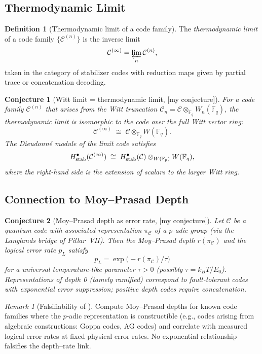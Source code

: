 \documentclass[12pt]{article}
\theoremstyle{definition}
\newtheorem{definition}{Definition}[section]
\theoremstyle{plain}
\newtheorem{conjecture}{Conjecture}[section]
\theoremstyle{remark}
\newtheorem{remark}{Remark}[section]
\newcommand{\myconj}{{\color{orange}[\textsf{my conjecture}]}}
\newcommand{\Fp}{\mathbb{F}_p}
\newcommand{\Fq}{\mathbb{F}_q}
\newcommand{\cC}{\mathcal{C}}
\begin{document}
\subsection{Thermodynamic Limit}

\begin{definition}[Thermodynamic limit of a code family]
The \emph{thermodynamic limit} of a code family $\{\cC^{(n)}\}$ is the inverse limit
\[
\cC^{(\infty)}=\varprojlim_{n}\cC^{(n)},
\]
taken in the category of stabilizer codes with reduction maps given by partial trace or concatenation decoding.
\end{definition}

\begin{conjecture}[Witt limit = thermodynamic limit, \myconj]\label{conj:thermo-limit}
For a code family $\cC^{(n)}$ that arises from the Witt truncation $\cC_n=\cC\otimes_{\Fq}W_n(\Fq)$, the thermodynamic limit is isomorphic to the code over the full Witt vector ring:
\[
\cC^{(\infty)}\;\cong\; \cC\otimes_{\Fq}W(\Fq).
\]
The Dieudonn\'{e} module of the limit code satisfies
\[
H^{\bullet}_{\textup{stab}}(\cC^{(\infty)})\;\cong\; H^{\bullet}_{\textup{stab}}(\cC)\otimes_{W(\Fp)}W(\Fq),
\]
where the right-hand side is the extension of scalars to the larger Witt ring.
\end{conjecture}

\subsection{Connection to Moy--Prasad Depth}

\begin{conjecture}[Moy--Prasad depth as error rate, \myconj]\label{conj:moy-prasad}
Let $\cC$ be a quantum code with associated representation $\pi_{\cC}$ of a $p$-adic group (via the Langlands bridge of Pillar~VII). Then the Moy--Prasad depth $r(\pi_{\cC})$ and the logical error rate $p_L$ satisfy
\[
p_L = \exp\!\bigl(-r(\pi_{\cC})/ \tau \bigr)
\]
for a universal temperature-like parameter $\tau>0$ (possibly $\tau=k_B T/E_0$). Representations of depth 0 (tamely ramified) correspond to fault-tolerant codes with exponential error suppression; positive depth codes require concatenation.
\end{conjecture}

\begin{remark}[Falsifiability of ]
Compute Moy--Prasad depths for known code families where the $p$-adic representation is constructible (e.g., codes arising from algebraic constructions: Goppa codes, AG codes) and correlate with measured logical error rates at fixed physical error rates. No exponential relationship falsifies the depth--rate link.
\end{remark}
\end{document}
